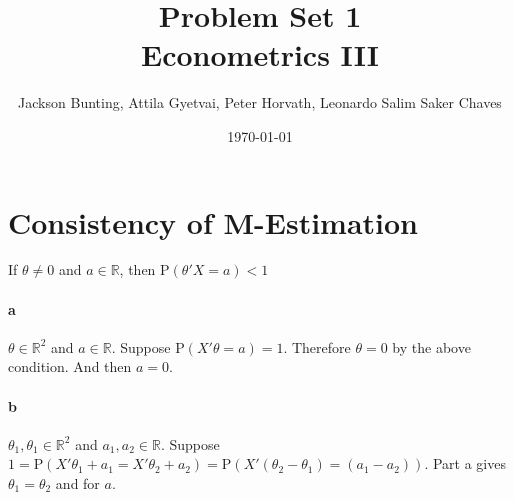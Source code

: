 \documentclass[11pt,letterpaper]{article}                  %
\title{Problem Set 1 \\ \medskip \Large{Econometrics III}}
\author{\Large Jackson Bunting, Attila Gyetvai, Peter Horvath, Leonardo Salim Saker Chaves}
\date{\today}
\begin{document}
\maketitle
\section*{Consistency of M-Estimation} 


\begin{problem}
\end{problem}

\bigskip
\begin{problem}
If $\theta \neq 0$ and $a \in \mathbb{R}$, then
$\mathrm{P}(\theta' X = a) < 1$
\paragraph*{a}
$\theta \in \mathbb{R}^2$ and $a \in \mathbb{R}$. Suppose
$\mathrm{P}(X'\theta = a) = 1$. Therefore $\theta = 0$ by the above
condition. And then $a = 0$.

\paragraph*{b}
$\theta_1,\theta_1 \in \mathbb{R}^2$ and $a_1,a_2 \in
\mathbb{R}$. Suppose $1 = \mathrm{P}(X'\theta_1 + a_1 = X'\theta_2 +
a_2) = \mathrm{P}\left(X'(\theta_2-\theta_1) = (a_1-a_2)\right)$. Part
a gives $\theta_1 = \theta_2$ and for $a$.
\end{problem}

\bigskip
\begin{problem}
\end{problem}

\end{document}
